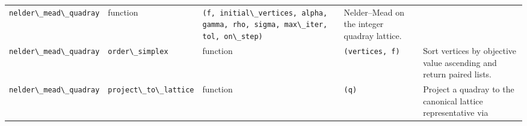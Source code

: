 \documentclass[
  10pt,
]{article}
\newcommand{\passthrough}[1]{#1}
\begin{document}
\begin{longtable}[]{@{}lllll@{}}
\begin{minipage}[t]{0.17\columnwidth}
\passthrough{\lstinline!nelder\_mead\_quadray!}\strut
\end{minipage} & \begin{minipage}[t]{0.17\columnwidth}\raggedright
function\strut
\end{minipage} & \begin{minipage}[t]{0.17\columnwidth}\raggedright
\passthrough{\lstinline!(f, initial\_vertices, alpha, gamma, rho, sigma, max\_iter, tol, on\_step)!}\strut
\end{minipage} & \begin{minipage}[t]{0.17\columnwidth}\raggedright
Nelder--Mead on the integer quadray lattice.\strut
\end{minipage}\tabularnewline
\begin{minipage}[t]{0.17\columnwidth}\raggedright
\passthrough{\lstinline!nelder\_mead\_quadray!}\strut
\end{minipage} & \begin{minipage}[t]{0.17\columnwidth}\raggedright
\passthrough{\lstinline!order\_simplex!}\strut
\end{minipage} & \begin{minipage}[t]{0.17\columnwidth}\raggedright
function\strut
\end{minipage} & \begin{minipage}[t]{0.17\columnwidth}\raggedright
\passthrough{\lstinline!(vertices, f)!}\strut
\end{minipage} & \begin{minipage}[t]{0.17\columnwidth}\raggedright
Sort vertices by objective value ascending and return paired
lists.\strut
\end{minipage}\tabularnewline
\begin{minipage}[t]{0.17\columnwidth}\raggedright
\passthrough{\lstinline!nelder\_mead\_quadray!}\strut
\end{minipage} & \begin{minipage}[t]{0.17\columnwidth}\raggedright
\passthrough{\lstinline!project\_to\_lattice!}\strut
\end{minipage} & \begin{minipage}[t]{0.17\columnwidth}\raggedright
function\strut
\end{minipage} & \begin{minipage}[t]{0.17\columnwidth}\raggedright
\passthrough{\lstinline!(q)!}\strut
\end{minipage} & \begin{minipage}[t]{0.17\columnwidth}\raggedright
Project a quadray to the canonical lattice representative via

\end{minipage}
\end{longtable}
\end{document}
